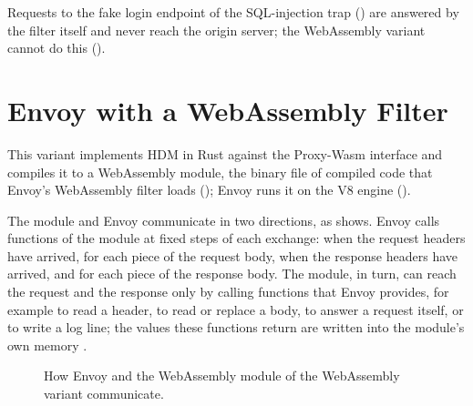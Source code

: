 \documentclass{rptuma}
\begin{document}
Requests to the fake login endpoint of the
SQL-injection trap () are answered by the filter itself and never reach the
origin server; the WebAssembly variant cannot do this ().

\section{Envoy with a WebAssembly Filter}
\label{sec:impl.wasm}

This variant implements HDM in Rust against the Proxy-Wasm interface and compiles it to a
WebAssembly module, the binary file of compiled code that Envoy's WebAssembly filter loads
(); Envoy runs it on the V8 engine ().

The module and Envoy communicate in two directions, as  shows. Envoy calls
functions of the module at fixed steps of each exchange: when the request headers have arrived, for
each piece of the request body, when the response headers have arrived, and for each piece of the
response body. The module, in turn, can reach the request and the response only by calling
functions that Envoy provides, for example to read a header, to read or replace a body, to answer a
request itself, or to write a log line; the values these functions return are written into the
module's own memory \cite{proxywasm_spec,haas2017wasm}.

\begin{figure}[htbp]
\centering
{}
\caption{How Envoy and the WebAssembly module of the WebAssembly variant communicate.}
\label{fig:impl.wasm}
\end{figure}
\end{document}

